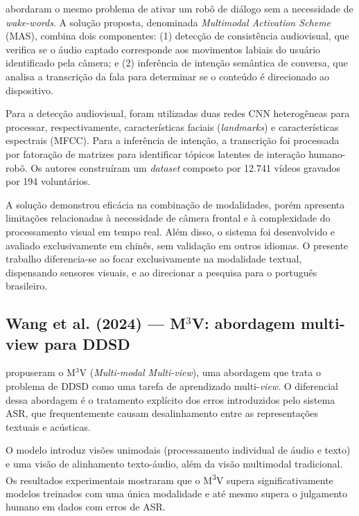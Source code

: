 \documentclass[
    12pt,                %
    openright,           %
    oneside,             %
    a4paper,             %
    english,             %
    brazil               %
]{abntex2}
\begin{document}
 abordaram o mesmo problema de ativar um robô de diálogo sem a necessidade de \textit{wake-words}. A solução proposta, denominada \textit{Multimodal Activation Scheme} (MAS), combina dois componentes: (1) detecção de consistência audiovisual, que verifica se o áudio captado corresponde aos movimentos labiais do usuário identificado pela câmera; e (2) inferência de intenção semântica de conversa, que analisa a transcrição da fala para determinar se o conteúdo é direcionado ao dispositivo.

Para a detecção audiovisual, foram utilizadas duas redes CNN heterogêneas para processar, respectivamente, características faciais (\textit{landmarks}) e características espectrais (MFCC). Para a inferência de intenção, a transcrição foi processada por fatoração de matrizes para identificar tópicos latentes de interação humano-robô. Os autores construíram um \textit{dataset} composto por 12.741 vídeos gravados por 194 voluntários.

A solução demonstrou eficácia na combinação de modalidades, porém apresenta limitações relacionadas à necessidade de câmera frontal e à complexidade do processamento visual em tempo real. Além disso, o sistema foi desenvolvido e avaliado exclusivamente em chinês, sem validação em outros idiomas. O presente trabalho diferencia-se ao focar exclusivamente na modalidade textual, dispensando sensores visuais, e ao direcionar a pesquisa para o português brasileiro.

\subsection{Wang et al. (2024) --- M$^{3}$V: abordagem multi-view para DDSD}

 propuseram o M$^{3}$V (\textit{Multi-modal Multi-view}), uma abordagem que trata o problema de DDSD como uma tarefa de aprendizado multi-\textit{view}. O diferencial dessa abordagem é o tratamento explícito dos erros introduzidos pelo sistema ASR, que frequentemente causam desalinhamento entre as representações textuais e acústicas.

O modelo introduz visões unimodais (processamento individual de áudio e texto) e uma visão de alinhamento texto-áudio, além da visão multimodal tradicional. Os resultados experimentais mostraram que o M\textsuperscript{3}V supera significativamente modelos treinados com uma única modalidade e até mesmo supera o julgamento humano em dados com erros de ASR.
\end{document}

